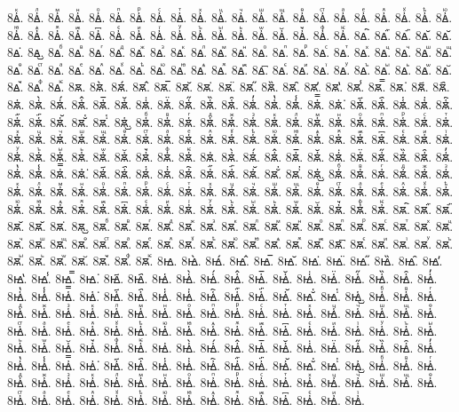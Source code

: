 {8ꙙ҆ⷦ.
8ꙙ҆ⷧ.
8ꙙ҆ⷨ.
8ꙙ҆ⷩ.
8ꙙ҆ⷪ.
8ꙙ҆ⷫ.
8ꙙ҆ⷬ.
8ꙙ҆ⷭ.
8ꙙ҆ⷮ.
8ꙙ҆ⷯ.
8ꙙ҆ⷰ.
8ꙙ҆ⷱ.
8ꙙ҆ⷲ.
8ꙙ҆ⷳ.
8ꙙ҆ⷴ.
8ꙙ҆ⷵ.
8ꙙ҆ⷶ.
8ꙙ҆ⷷ.
8ꙙ҆ⷸ.
8ꙙ҆ⷹ.
8ꙙ҆ⷺ.
8ꙙ҆ⷻ.
8ꙙ҆ⷼ.
8ꙙ҆ⷽ.
8ꙙ҆ⷾ.
8ꙙ҆ⷿ.
8ꙙ҆꙯.
8ꙙ҆ꙴ.
8ꙙ҆ꙵ.
8ꙙ҆ꙶ.
8ꙙ҆ꙷ.
8ꙙ҆ꙸ.
8ꙙ҆ꙹ.
8ꙙ҆ꙺ.
8ꙙ҆ꙻ.
8ꙙ҆꙼.
8ꙙ҆꙽.
8ꙙ҆ꚞ.
8ꙙ҆ꚟ.
8ꙙ҇.
8ꙙ᷀.
8ꙙ᷁.
8ꙙ᷶.
8ꙙ᷷.
8ꙙ᷸.
8ꙙ᷹.
8ꙙⷠ.
8ꙙⷡ.
8ꙙⷢ.
8ꙙⷣ.
8ꙙⷤ.
8ꙙⷥ.
8ꙙⷦ.
8ꙙⷧ.
8ꙙⷨ.
8ꙙⷩ.
8ꙙⷪ.
8ꙙⷫ.
8ꙙⷬ.
8ꙙⷭ.
8ꙙⷮ.
8ꙙⷯ.
8ꙙⷰ.
8ꙙⷱ.
8ꙙⷲ.
8ꙙⷳ.
8ꙙⷴ.
8ꙙⷵ.
8ꙙⷶ.
8ꙙⷷ.
8ꙙⷸ.
8ꙙⷹ.
8ꙙⷺ.
8ꙙⷻ.
8ꙙⷼ.
8ꙙⷽ.
8ꙙⷾ.
8ꙙⷿ.
8ꙙ꙯.
8ꙙꙴ.
8ꙙꙵ.
8ꙙꙶ.
8ꙙꙷ.
8ꙙꙸ.
8ꙙꙹ.
8ꙙꙺ.
8ꙙꙻ.
8ꙙ꙼.
8ꙙ꙽.
8ꙙꚞ.
8ꙙꚟ.
8ꙛ.
8ꙛ̀.
8ꙛ́.
8ꙛ̂.
8ꙛ̅.
8ꙛ̆.
8ꙛ̇.
8ꙛ̈.
8ꙛ̋.
8ꙛ̏.
8ꙛ̑.
8ꙛ̓.
8ꙛ̔.
8ꙛ̾.
8ꙛ̿.
8ꙛ͘.
8ꙛ҃.
8ꙛ҄.
8ꙛ҅.
8ꙛ҅̀.
8ꙛ҅́.
8ꙛ҅̂.
8ꙛ҅̅.
8ꙛ҅̆.
8ꙛ҅̇.
8ꙛ҅̈.
8ꙛ҅̋.
8ꙛ҅̏.
8ꙛ҅̑.
8ꙛ҅̓.
8ꙛ҅̔.
8ꙛ҅̾.
8ꙛ҅̿.
8ꙛ҅͘.
8ꙛ҅҃.
8ꙛ҅҄.
8ꙛ҅҅.
8ꙛ҅҆.
8ꙛ҅҇.
8ꙛ҅᷀.
8ꙛ҅᷁.
8ꙛ҅᷶.
8ꙛ᷷҅.
8ꙛ᷸҅.
8ꙛ᷹҅.
8ꙛ҅ⷠ.
8ꙛ҅ⷡ.
8ꙛ҅ⷢ.
8ꙛ҅ⷣ.
8ꙛ҅ⷤ.
8ꙛ҅ⷥ.
8ꙛ҅ⷦ.
8ꙛ҅ⷧ.
8ꙛ҅ⷨ.
8ꙛ҅ⷩ.
8ꙛ҅ⷪ.
8ꙛ҅ⷫ.
8ꙛ҅ⷬ.
8ꙛ҅ⷭ.
8ꙛ҅ⷮ.
8ꙛ҅ⷯ.
8ꙛ҅ⷰ.
8ꙛ҅ⷱ.
8ꙛ҅ⷲ.
8ꙛ҅ⷳ.
8ꙛ҅ⷴ.
8ꙛ҅ⷵ.
8ꙛ҅ⷶ.
8ꙛ҅ⷷ.
8ꙛ҅ⷸ.
8ꙛ҅ⷹ.
8ꙛ҅ⷺ.
8ꙛ҅ⷻ.
8ꙛ҅ⷼ.
8ꙛ҅ⷽ.
8ꙛ҅ⷾ.
8ꙛ҅ⷿ.
8ꙛ҅꙯.
8ꙛ҅ꙴ.
8ꙛ҅ꙵ.
8ꙛ҅ꙶ.
8ꙛ҅ꙷ.
8ꙛ҅ꙸ.
8ꙛ҅ꙹ.
8ꙛ҅ꙺ.
8ꙛ҅ꙻ.
8ꙛ҅꙼.
8ꙛ҅꙽.
8ꙛ҅ꚞ.
8ꙛ҅ꚟ.
8ꙛ҆.
8ꙛ҆̀.
8ꙛ҆́.
8ꙛ҆̂.
8ꙛ҆̅.
8ꙛ҆̆.
8ꙛ҆̇.
8ꙛ҆̈.
8ꙛ҆̋.
8ꙛ҆̏.
8ꙛ҆̑.
8ꙛ҆̓.
8ꙛ҆̔.
8ꙛ҆̾.
8ꙛ҆̿.
8ꙛ҆͘.
8ꙛ҆҃.
8ꙛ҆҄.
8ꙛ҆҅.
8ꙛ҆҆.
8ꙛ҆҇.
8ꙛ҆᷀.
8ꙛ҆᷁.
8ꙛ҆᷶.
8ꙛ᷷҆.
8ꙛ᷸҆.
8ꙛ᷹҆.
8ꙛ҆ⷠ.
8ꙛ҆ⷡ.
8ꙛ҆ⷢ.
8ꙛ҆ⷣ.
8ꙛ҆ⷤ.
8ꙛ҆ⷥ.
8ꙛ҆ⷦ.
8ꙛ҆ⷧ.
8ꙛ҆ⷨ.
8ꙛ҆ⷩ.
8ꙛ҆ⷪ.
8ꙛ҆ⷫ.
8ꙛ҆ⷬ.
8ꙛ҆ⷭ.
8ꙛ҆ⷮ.
8ꙛ҆ⷯ.
8ꙛ҆ⷰ.
8ꙛ҆ⷱ.
8ꙛ҆ⷲ.
8ꙛ҆ⷳ.
8ꙛ҆ⷴ.
8ꙛ҆ⷵ.
8ꙛ҆ⷶ.
8ꙛ҆ⷷ.
8ꙛ҆ⷸ.
8ꙛ҆ⷹ.
8ꙛ҆ⷺ.
8ꙛ҆ⷻ.
8ꙛ҆ⷼ.
8ꙛ҆ⷽ.
8ꙛ҆ⷾ.
8ꙛ҆ⷿ.
8ꙛ҆꙯.
8ꙛ҆ꙴ.
8ꙛ҆ꙵ.
8ꙛ҆ꙶ.
8ꙛ҆ꙷ.
8ꙛ҆ꙸ.
8ꙛ҆ꙹ.
8ꙛ҆ꙺ.
8ꙛ҆ꙻ.
8ꙛ҆꙼.
8ꙛ҆꙽.
8ꙛ҆ꚞ.
8ꙛ҆ꚟ.
8ꙛ҇.
8ꙛ᷀.
8ꙛ᷁.
8ꙛ᷶.
8ꙛ᷷.
8ꙛ᷸.
8ꙛ᷹.
8ꙛⷠ.
8ꙛⷡ.
8ꙛⷢ.
8ꙛⷣ.
8ꙛⷤ.
8ꙛⷥ.
8ꙛⷦ.
8ꙛⷧ.
8ꙛⷨ.
8ꙛⷩ.
8ꙛⷪ.
8ꙛⷫ.
8ꙛⷬ.
8ꙛⷭ.
8ꙛⷮ.
8ꙛⷯ.
8ꙛⷰ.
8ꙛⷱ.
8ꙛⷲ.
8ꙛⷳ.
8ꙛⷴ.
8ꙛⷵ.
8ꙛⷶ.
8ꙛⷷ.
8ꙛⷸ.
8ꙛⷹ.
8ꙛⷺ.
8ꙛⷻ.
8ꙛⷼ.
8ꙛⷽ.
8ꙛⷾ.
8ꙛⷿ.
8ꙛ꙯.
8ꙛꙴ.
8ꙛꙵ.
8ꙛꙶ.
8ꙛꙷ.
8ꙛꙸ.
8ꙛꙹ.
8ꙛꙺ.
8ꙛꙻ.
8ꙛ꙼.
8ꙛ꙽.
8ꙛꚞ.
8ꙛꚟ.
8ꙝ.
8ꙝ̀.
8ꙝ́.
8ꙝ̂.
8ꙝ̅.
8ꙝ̆.
8ꙝ̇.
8ꙝ̈.
8ꙝ̋.
8ꙝ̏.
8ꙝ̑.
8ꙝ̓.
8ꙝ̔.
8ꙝ̾.
8ꙝ̿.
8ꙝ͘.
8ꙝ҃.
8ꙝ҄.
8ꙝ҅.
8ꙝ҅̀.
8ꙝ҅́.
8ꙝ҅̂.
8ꙝ҅̅.
8ꙝ҅̆.
8ꙝ҅̇.
8ꙝ҅̈.
8ꙝ҅̋.
8ꙝ҅̏.
8ꙝ҅̑.
8ꙝ҅̓.
8ꙝ҅̔.
8ꙝ҅̾.
8ꙝ҅̿.
8ꙝ҅͘.
8ꙝ҅҃.
8ꙝ҅҄.
8ꙝ҅҅.
8ꙝ҅҆.
8ꙝ҅҇.
8ꙝ҅᷀.
8ꙝ҅᷁.
8ꙝ҅᷶.
8ꙝ᷷҅.
8ꙝ᷸҅.
8ꙝ᷹҅.
8ꙝ҅ⷠ.
8ꙝ҅ⷡ.
8ꙝ҅ⷢ.
8ꙝ҅ⷣ.
8ꙝ҅ⷤ.
8ꙝ҅ⷥ.
8ꙝ҅ⷦ.
8ꙝ҅ⷧ.
8ꙝ҅ⷨ.
8ꙝ҅ⷩ.
8ꙝ҅ⷪ.
8ꙝ҅ⷫ.
8ꙝ҅ⷬ.
8ꙝ҅ⷭ.
8ꙝ҅ⷮ.
8ꙝ҅ⷯ.
8ꙝ҅ⷰ.
8ꙝ҅ⷱ.
8ꙝ҅ⷲ.
8ꙝ҅ⷳ.
8ꙝ҅ⷴ.
8ꙝ҅ⷵ.
8ꙝ҅ⷶ.
8ꙝ҅ⷷ.
8ꙝ҅ⷸ.
8ꙝ҅ⷹ.
8ꙝ҅ⷺ.
8ꙝ҅ⷻ.
8ꙝ҅ⷼ.
8ꙝ҅ⷽ.
8ꙝ҅ⷾ.
8ꙝ҅ⷿ.
8ꙝ҅꙯.
8ꙝ҅ꙴ.
8ꙝ҅ꙵ.
8ꙝ҅ꙶ.
8ꙝ҅ꙷ.
8ꙝ҅ꙸ.
8ꙝ҅ꙹ.
8ꙝ҅ꙺ.
8ꙝ҅ꙻ.
8ꙝ҅꙼.
8ꙝ҅꙽.
8ꙝ҅ꚞ.
8ꙝ҅ꚟ.
8ꙝ҆.
8ꙝ҆̀.
8ꙝ҆́.
8ꙝ҆̂.
8ꙝ҆̅.
8ꙝ҆̆.
8ꙝ҆̇.
8ꙝ҆̈.
8ꙝ҆̋.
8ꙝ҆̏.
8ꙝ҆̑.
8ꙝ҆̓.
8ꙝ҆̔.
8ꙝ҆̾.
8ꙝ҆̿.
8ꙝ҆͘.
8ꙝ҆҃.
8ꙝ҆҄.
8ꙝ҆҅.
8ꙝ҆҆.
8ꙝ҆҇.
8ꙝ҆᷀.
8ꙝ҆᷁.
8ꙝ҆᷶.
8ꙝ᷷҆.
8ꙝ᷸҆.
8ꙝ᷹҆.
8ꙝ҆ⷠ.
8ꙝ҆ⷡ.
8ꙝ҆ⷢ.
8ꙝ҆ⷣ.
8ꙝ҆ⷤ.
8ꙝ҆ⷥ.
8ꙝ҆ⷦ.
8ꙝ҆ⷧ.
8ꙝ҆ⷨ.
8ꙝ҆ⷩ.
8ꙝ҆ⷪ.
8ꙝ҆ⷫ.
8ꙝ҆ⷬ.
8ꙝ҆ⷭ.
8ꙝ҆ⷮ.
8ꙝ҆ⷯ.
8ꙝ҆ⷰ.
8ꙝ҆ⷱ.
8ꙝ҆ⷲ.
8ꙝ҆ⷳ.
8ꙝ҆ⷴ.
8ꙝ҆ⷵ.
8ꙝ҆ⷶ.
8ꙝ҆ⷷ.
8ꙝ҆ⷸ.
8ꙝ҆ⷹ.
8ꙝ҆ⷺ.
8ꙝ҆ⷻ.
8ꙝ҆ⷼ.
8ꙝ҆ⷽ.
8ꙝ҆ⷾ.
8ꙝ҆ⷿ.
8ꙝ҆꙯.
8ꙝ҆ꙴ.
8ꙝ҆ꙵ.
8ꙝ҆ꙶ.
}
